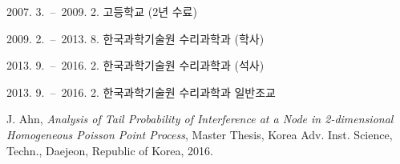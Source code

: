 \curriculumvitae[3]
		\begin{personaldata}
				\address    { ...}
		 \end{personaldata}

		\begin{education}
				\item[2007. 3.\ --\ 2009. 2.] 고등학교 (2년 수료)
				\item[2009. 2.\ --\ 2013. 8.] 한국과학기술원 수리과학과 (학사)
				\item[2013. 9.\ --\ 2016. 2.] 한국과학기술원 수리과학과 (석사)
		\end{education}

		\begin{career}
				\item[2013. 9.\ --\ 2016. 2.] 한국과학기술원 수리과학과 일반조교
		\end{career}


		\begin{publication}
				\item J. Ahn, \textit{Analysis of Tail Probability of Interference at a Node in 2-dimensional Homogeneous Poisson Point Process}, Master Thesis, Korea Adv. Inst. Science, Techn., Daejeon, Republic of Korea, 2016.
		\end{publication}

